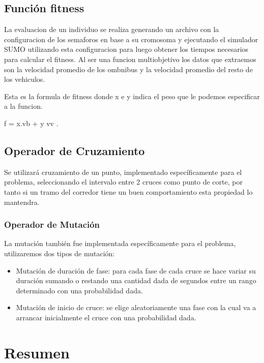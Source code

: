 \subsection{Función fitness}
La evaluacion de un individuo se realiza generando un archivo con la configuracion de los semaforos en base a su cromosoma y ejecutando el simulador SUMO utilizando esta configuracion para luego obtener los tiempos necesarios para calcular el fitness.
Al ser una funcion multiobjetivo los datos que extraemos son la velocidad promedio de los ombnibus y la velocidad promedio del resto de los vehiculos.

Esta es la formula de fitness donde x e y indica el peso que le podemos especificar a la funcion.

f = x.vb + y vv
.

\subsection{Operador de Cruzamiento}
Se  utilizará cruzamiento  de  un  punto,  implementado
específicamente  para  el  problema,  seleccionando  el  intervalo
entre 2 cruces como punto de corte, por tanto si un tramo del corredor tiene un buen comportamiento esta propiedad lo mantendra.


\subsubsection{Operador de Mutación}
La  mutación también fue  implementada  específicamente para
el problema, utilizaremos dos tipos de mutación:
\begin{itemize}

\item Mutación de duración de fase: para cada fase de cada cruce se
hace variar su duración sumando o restando una cantidad dada
de segundos entre un rango determinado con una probabilidad
dada.
\item Mutación de inicio de cruce: se elige aleatoriamente una fase
con  la  cual  va  a  arrancar  inicialmente  el  cruce  con  una
probabilidad dada.

\end{itemize}

\section{Resumen}
